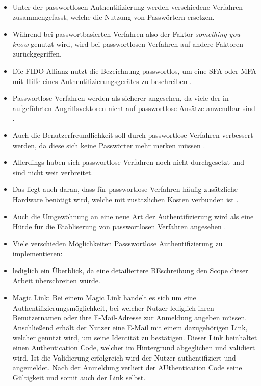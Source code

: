 \begin{itemize}
    \item Unter der passwortlosen Authentifizierung werden verschiedene Verfahren zusammengefasst, welche die Nutzung von Passwörtern ersetzen.
    \item Während bei passwortbasierten Verfahren also der Faktor \textit{something you know} genutzt wird, wird bei passwortlosen Verfahren auf andere Faktoren zurückgegriffen.
    \item Die \ac{FIDO} Allianz nutzt die Bezeichnung passwortlos, um eine \ac{SFA} oder \ac{MFA} mit Hilfe eines Authentifizierungsgerätes zu beschreiben \cite{farke2020you}.
    \item Passwortlose Verfahren werden als sicherer angesehen, da viele der in \textbf{} aufgeführten Angriffsvektoren nicht auf passwortlose Ansätze anwendbar sind \cite{chowhan2019password} \cite{parmar2022comprehensive}.
    \item Auch die Benutzerfreundlichkeit soll durch passwortlose Verfahren verbessert werden, da diese sich keine Passwörter mehr merken müssen \cite{chowhan2019password}.
    \item Allerdings haben sich passwortlose Verfahren noch nicht durchgesetzt und sind nicht weit verbreitet.
    \item Das liegt auch daran, dass für passwortlose Verfahren häufig zusätzliche Hardware benötigt wird, welche mit zusätzlichen Kosten verbunden ist \cite{chowhan2019password}.
    \item Auch die Umgewöhnung an eine neue Art der Authentifizierung wird als eine Hürde für die Etabliserung von passwortlosen Verfahren angesehen \cite{chowhan2019password}.
    \item Viele verschieden Möglichkeiten Passswortlose Authentifizierung zu implementieren:
    \item lediglich ein Überblick, da eine detailiertere BEschreibung den Scope dieser Arbeit überschreiten würde.
    \item Magic Link:
    Bei einem Magic Link handelt es sich um eine
    Authentifizierungsmöglichkeit, bei welcher Nutzer
    lediglich ihren Benutzernamen oder ihre E-Mail-Adresse
    zur Anmeldung angeben müssen. Anschließend erhält der Nutzer eine E-Mail mit einem dazugehörigen Link, welcher genutzt wird, um seine Identität zu bestätigen. \cite{chowhan2019password} \cite{parmar2022comprehensive}
    Dieser Link beinhaltet einen Authentication Code, welcher im Hintergrund abgeglichen und validiert wird. Ist die Validierung erfolgreich wird der Nutzer authentifiziert und angemeldet. Nach der Anmeldung verliert der AUthentication Code seine Gültigkeit und somit auch der Link selbst. \cite{chowhan2019password}

\end{itemize}
